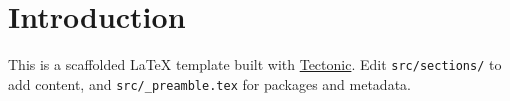 \section{Introduction}

This is a scaffolded LaTeX template built with \href{https://tectonic-typesetting.github.io/}{Tectonic}.
Edit \texttt{src/sections/} to add content, and \texttt{src/\_preamble.tex} for packages and metadata.
